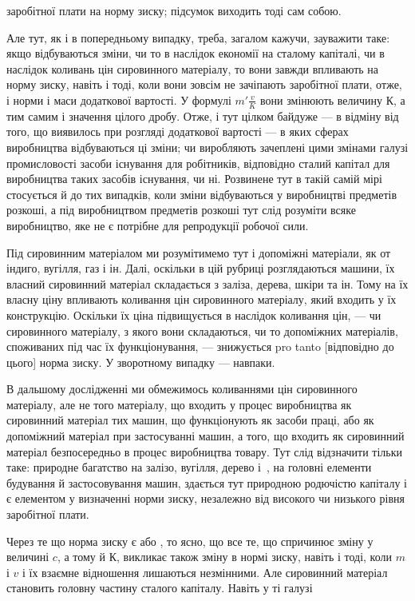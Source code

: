 \parcont{}  %
заробітної плати на норму зиску; підсумок виходить тоді сам
собою.

Але тут, як і в попередньому випадку, треба, загалом кажучи, зауважити таке: якщо відбуваються
зміни, чи то в наслідок економії на сталому капіталі, чи в наслідок коливань цін сировинного
матеріалу, то вони завжди впливають на норму
зиску, навіть і тоді, коли вони зовсім не зачіпають заробітної плати, отже, і норми і маси
додаткової вартості. У формулі $m' \frac{v}{K}$ вони змінюють величину $К$, а тим самим і значення цілого дробу.
Отже, і тут цілком байдуже — в відміну від того, що виявилось при розгляді додаткової вартості — в
яких сферах виробництва відбуваються ці зміни; чи виробляють зачеплені цими змінами галузі
промисловості засоби існування для робітників,
відповідно сталий капітал для виробництва таких засобів існування, чи ні. Розвинене тут в такій
самій мірі стосується й до
тих випадків, коли зміни відбуваються у виробництві предметів
розкоші, а під виробництвом предметів розкоші тут слід розуміти всяке виробництво, яке не є потрібне
для репродукції робочої сили.

Під сировинним матеріалом ми розумітимемо тут і допоміжні
матеріали, як от індиго, вугілля, газ і ін. Далі, оскільки в цій
рубриці розглядаються машини, їх власний сировинний матеріал
складається з заліза, дерева, шкіри та ін. Тому на їх власну
ціну впливають коливання цін сировинного матеріалу, який входить у їх конструкцію. Оскільки їх ціна
підвищується в наслідок коливання цін, — чи сировинного матеріалу, з якого вони складаються, чи то
допоміжних матеріалів, споживаних під час
їх функціонування, — знижується pro tanto [відповідно до цього]
норма зиску. У зворотному випадку — навпаки.

В дальшому дослідженні ми обмежимось коливаннями цін сировинного матеріалу, але не того матеріалу,
що входить у процес виробництва як сировинний матеріал тих машин, що функціонують як засоби праці,
або як допоміжний матеріал при застосуванні машин, а того, що входить як сировинний матеріал
безпосередньо в процес виробництва товару. Тут слід відзначити тільки таке: природне багатство на
залізо, вугілля, дерево
і~, на головні елементи будування й застосовування машин,
здається тут природною родючістю капіталу і є елементом
у визначенні норми зиску, незалежно від високого чи низького
рівня заробітної плати.

Через те що норма зиску є  або \deq{} , то ясно, що все те, що спричинює
зміну у величині $c$, а тому й $К$, викликає
також зміну в нормі зиску, навіть і тоді, коли $m$ і $v$ і їх взаємне
відношення лишаються незмінними. Але сировинний матеріал
становить головну частину сталого капіталу. Навіть у ті галузі
\parbreak{}  %
